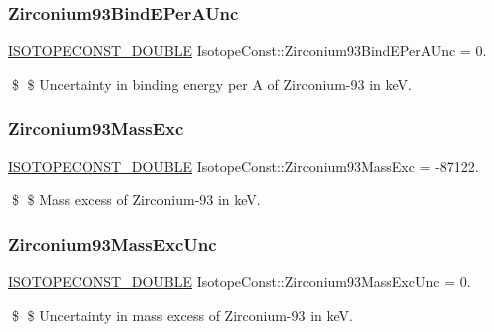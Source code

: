 \subsubsection{\texorpdfstring{Zirconium93\+Bind\+E\+Per\+A\+Unc}{Zirconium93BindEPerAUnc}}
{\footnotesize\ttfamily \mbox{\hyperlink{group___isotope_const-_macros_ga8f45a7272ce02c0b4c65c44636ed719a}{I\+S\+O\+T\+O\+P\+E\+C\+O\+N\+S\+T\+\_\+\+D\+O\+U\+B\+LE}} Isotope\+Const\+::\+Zirconium93\+Bind\+E\+Per\+A\+Unc = 0.}

\$ \$ Uncertainty in binding energy per A of Zirconium-\/93 in keV. \mbox{\label{group___isotope_const-_zirconium-_zr93_ga8f5b4b8ef56f7913f9859489e5ee94df}} 
\subsubsection{\texorpdfstring{Zirconium93\+Mass\+Exc}{Zirconium93MassExc}}
{\footnotesize\ttfamily \mbox{\hyperlink{group___isotope_const-_macros_ga8f45a7272ce02c0b4c65c44636ed719a}{I\+S\+O\+T\+O\+P\+E\+C\+O\+N\+S\+T\+\_\+\+D\+O\+U\+B\+LE}} Isotope\+Const\+::\+Zirconium93\+Mass\+Exc = -\/87122.}

\$ \$ Mass excess of Zirconium-\/93 in keV. \mbox{\label{group___isotope_const-_zirconium-_zr93_ga05e602f5ff218ee37e03280238c322de}} 
\subsubsection{\texorpdfstring{Zirconium93\+Mass\+Exc\+Unc}{Zirconium93MassExcUnc}}
{\footnotesize\ttfamily \mbox{\hyperlink{group___isotope_const-_macros_ga8f45a7272ce02c0b4c65c44636ed719a}{I\+S\+O\+T\+O\+P\+E\+C\+O\+N\+S\+T\+\_\+\+D\+O\+U\+B\+LE}} Isotope\+Const\+::\+Zirconium93\+Mass\+Exc\+Unc = 0.}

\$ \$ Uncertainty in mass excess of Zirconium-\/93 in keV. \mbox{\label{group___isotope_const-_zirconium-_zr93_ga07bd9b4aba62777f42f17d6608ae6f98}} 
